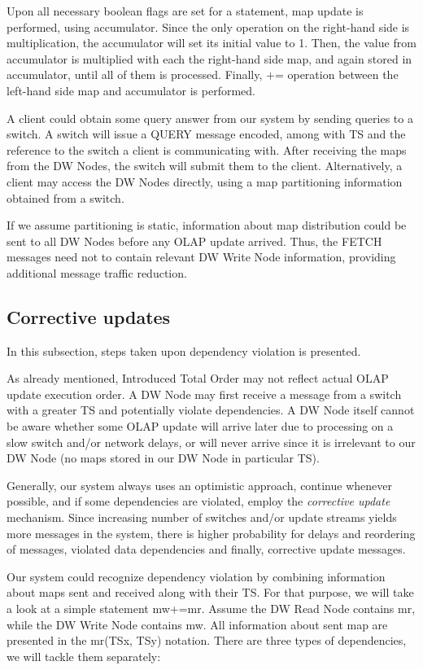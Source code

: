 \documentclass{sig-semester}
\def\OLAP{OLAP\xspace}
\def\EXORD{actual OLAP update execution order\xspace}
\begin{document}
Upon all necessary boolean flags are set for a statement, map update is performed, using accumulator. Since the only operation on the right-hand side is multiplication, the accumulator will set its initial value to 1. Then, the value from accumulator is multiplied with each the right-hand side map, and again stored in accumulator, until all of them is processed. Finally, += operation between the left-hand side map and accumulator is performed.

A client could obtain some query answer from our system by sending queries to a switch. A switch will issue a QUERY message encoded, among with TS and the reference to the switch a client is communicating with. After receiving the maps from the DW Nodes, the switch will submit them to the client. Alternatively, a client may access the DW Nodes directly, using a map partitioning information obtained from a switch.

If we assume partitioning is static, information about map distribution could be sent to all DW Nodes before any \OLAP update arrived. Thus, the FETCH messages need not to contain relevant DW Write Node information, providing additional message traffic reduction.

\subsection{Corrective updates}
\label{Corrective}
In this subsection, steps taken upon dependency violation is presented. 

As already mentioned, Introduced Total Order may not reflect \EXORD. A DW Node may first receive a message from a switch with a greater TS and potentially violate dependencies. A DW Node itself cannot be aware whether some \OLAP update will arrive later due to processing on a slow switch and/or network delays, or will never arrive since it is irrelevant to our DW Node (no maps stored in our DW Node in particular TS). 

Generally, our system always uses an optimistic approach, continue whenever possible, and if some dependencies are violated, employ the \textit{corrective update} mechanism. Since increasing number of switches and/or update streams yields more messages in the system, there is higher probability for delays and reordering of messages, violated data dependencies and finally, corrective update messages.

Our system could recognize dependency violation by combining information about maps sent and received along with their TS. For that purpose, we will take a look at a simple statement mw+=mr. Assume the DW Read Node contains mr, while the DW Write Node contains mw. All information about sent map are presented in the mr(TSx, TSy) notation. There are three types of dependencies, we will tackle them separately:
\end{document}
